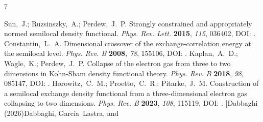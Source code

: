 \documentclass[journal=jctcce,manuscript=article]{achemso}
\begin{document}
\begin{mcitethebibliography}{7}
\providecommand*\natexlab[1]{#1}
\providecommand*\mciteSetBstSublistMode[1]{}
\providecommand*\mciteSetBstMaxWidthForm[2]{}
\providecommand*\mciteBstWouldAddEndPuncttrue
  {\def\EndOfBibitem{\unskip.}}
\providecommand*\mciteBstWouldAddEndPunctfalse
  {\let\EndOfBibitem\relax}
\providecommand*\mciteSetBstMidEndSepPunct[3]{}
\providecommand*\mciteSetBstSublistLabelBeginEnd[3]{}
\providecommand*\EndOfBibitem{}
\mciteSetBstSublistMode{f}
\mciteSetBstMaxWidthForm{subitem}{(\alph{mcitesubitemcount})}
\mciteSetBstSublistLabelBeginEnd
  {\mcitemaxwidthsubitemform\space}
  {\relax}
  {\relax}

Sun,~J.; Ruzsinszky,~A.; Perdew,~J.~P. Strongly constrained and appropriately
  normed semilocal density functional. \emph{Phys. Rev. Lett.} \textbf{2015},
  \emph{115}, 036402, DOI: \relax
\mciteBstWouldAddEndPuncttrue
\mciteSetBstMidEndSepPunct{\mcitedefaultmidpunct}
{\mcitedefaultendpunct}{\mcitedefaultseppunct}\relax
\EndOfBibitem
{}
Constantin,~L.~A. Dimensional crossover of the exchange-correlation energy at
  the semilocal level. \emph{Phys. Rev. B} \textbf{2008}, \emph{78}, 155106,
  DOI: \relax
\mciteBstWouldAddEndPuncttrue
\mciteSetBstMidEndSepPunct{\mcitedefaultmidpunct}
{\mcitedefaultendpunct}{\mcitedefaultseppunct}\relax
\EndOfBibitem
{}
Kaplan,~A.~D.; Wagle,~K.; Perdew,~J.~P. Collapse of the electron gas from three
  to two dimensions in {Kohn-Sham} density functional theory. \emph{Phys. Rev.
  B} \textbf{2018}, \emph{98}, 085147, DOI:
  \relax
\mciteBstWouldAddEndPuncttrue
\mciteSetBstMidEndSepPunct{\mcitedefaultmidpunct}
{\mcitedefaultendpunct}{\mcitedefaultseppunct}\relax
\EndOfBibitem
{}
Horowitz,~C.~M.; Proetto,~C.~R.; Pitarke,~J.~M. Construction of a semilocal
  exchange density functional from a three-dimensional electron gas collapsing
  to two dimensions. \emph{Phys. Rev. B} \textbf{2023}, \emph{108}, 115119,
  DOI: \relax
\mciteBstWouldAddEndPuncttrue
\mciteSetBstMidEndSepPunct{\mcitedefaultmidpunct}
{\mcitedefaultendpunct}{\mcitedefaultseppunct}\relax
\EndOfBibitem
\bibitem[Dabbaghi (2026)Dabbaghi, Garc{\'i}a~Lastra, and

\end{mcitethebibliography}
\end{document}
